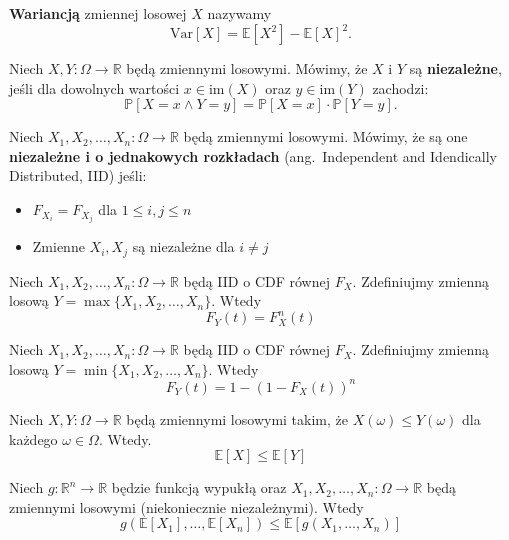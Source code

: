 \begin{definition}
\textbf{Wariancją} zmiennej losowej $X$ nazywamy
\[
    \mathrm{Var}[X] = \mathbb{E}[X^2]-\mathbb{E}[X]^2.
\]
\end{definition}

\begin{definition}
Niech $X,Y:\Omega\to\mathbb{R}$ będą zmiennymi losowymi.  
Mówimy, że $X$ i $Y$ są \textbf{niezależne}, jeśli dla dowolnych wartości $x \in \mathrm{im}(X)$ oraz $y \in \mathrm{im}(Y)$ zachodzi:
\[
\mathbb{P}[X = x \land Y = y] = \mathbb{P}[X = x] \cdot \mathbb{P}[Y = y].
\]
\end{definition}

\begin{definition}
Niech $X_1,X_2,\dots, X_n:\Omega\to\mathbb{R}$ będą zmiennymi losowymi. Mówimy, że są one \textbf{niezależne i o jednakowych rozkładach} (ang.~Independent and Idendically Distributed, IID) jeśli: 
\begin{itemize}
    \item $F_{X_i} = F_{X_j}$ dla $1\le i,j \le n$
    \item Zmienne $X_i,X_j$ są niezależne dla $i\ne j$
\end{itemize}  
\end{definition}

\begin{fact}\label{F:max_CDF}
Niech $X_1,X_2,\dots, X_n:\Omega\to\mathbb{R}$ będą IID o CDF równej $F_X$. Zdefiniujmy zmienną losową $Y = \max\{X_1,X_2,\dots, X_n\}$. Wtedy 
\[
    F_Y(t)=F_X^n(t)
\]
\end{fact}

\begin{fact}\label{F:min_CDF}
Niech $X_1,X_2,\dots, X_n:\Omega\to\mathbb{R}$ będą IID o CDF równej $F_X$. Zdefiniujmy zmienną losową $Y = \min\{X_1,X_2,\dots, X_n\}$. Wtedy 
\[
    F_Y(t)=1-(1-F_X(t))^n
\]
\end{fact}

\begin{fact}\label{F:montonicity_of_expectation}
Niech $X,Y:\Omega\to\mathbb{R}$ będą zmiennymi losowymi takim, że $X(\omega)\le Y(\omega)$ dla każdego $\omega\in\Omega$. Wtedy. 
\[
    \mathbb{E}[X] \le \mathbb{E}[Y]
\]
\end{fact}


\begin{theorem}\label{T:Jensen} 
Niech $g:\mathbb{R}^n\to\mathbb{R}$ będzie funkcją wypukłą oraz $X_1,X_2,\dots, X_n:\Omega\to\mathbb{R}$ będą zmiennymi losowymi (niekoniecznie niezależnymi). Wtedy
\[
    g(\mathbb{E}[X_1],\dots, \mathbb{E}[X_n]) \le \mathbb{E}[g(X_1,\dots,X_n)]
\]
\end{theorem}


